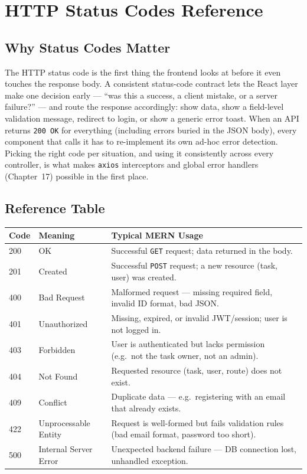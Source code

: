 \chapter{HTTP Status Codes Reference}

\section{Why Status Codes Matter}

The HTTP status code is the first thing the frontend looks at before it even
touches the response body. A consistent status-code contract lets the React
layer make one decision early --- ``was this a success, a client mistake, or a
server failure?'' --- and route the response accordingly: show data, show a
field-level validation message, redirect to login, or show a generic error
toast. When an API returns \texttt{200 OK} for everything (including errors
buried in the JSON body), every component that calls it has to re-implement
its own ad-hoc error detection. Picking the right code per situation, and
using it consistently across every controller, is what makes
\texttt{axios} interceptors and global error handlers (Chapter~17) possible
in the first place.

\section{Reference Table}

\begin{table}[h]
\centering
\begin{tabularx}{\textwidth}{l l X}
\toprule
\textbf{Code} & \textbf{Meaning} & \textbf{Typical MERN Usage} \\
\midrule
200 & OK & Successful \texttt{GET} request; data returned in the body. \\
201 & Created & Successful \texttt{POST} request; a new resource (task, user) was created. \\
400 & Bad Request & Malformed request --- missing required field, invalid ID format, bad JSON. \\
401 & Unauthorized & Missing, expired, or invalid JWT/session; user is not logged in. \\
403 & Forbidden & User is authenticated but lacks permission (e.g.\ not the task owner, not an admin). \\
404 & Not Found & Requested resource (task, user, route) does not exist. \\
409 & Conflict & Duplicate data --- e.g.\ registering with an email that already exists. \\
422 & Unprocessable Entity & Request is well-formed but fails validation rules (bad email format, password too short). \\
500 & Internal Server Error & Unexpected backend failure --- DB connection lost, unhandled exception. \\
\bottomrule
\end{tabularx}
\end{table}

